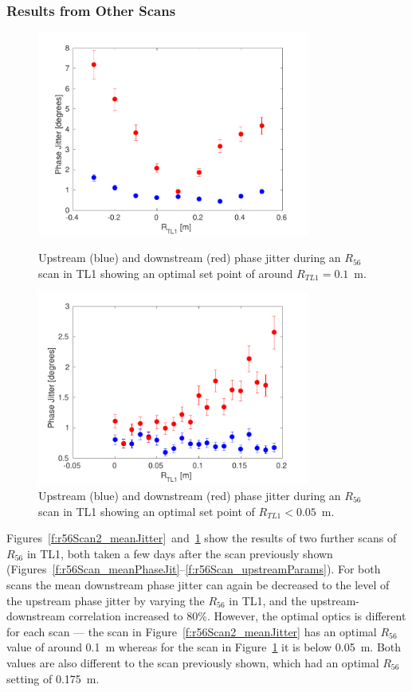 \subsubsection{Results from Other Scans}

\begin{figure}
  \centering
  \includegraphics[width=0.8\textwidth]{Figures/propagation/r56Scan2_meanJitter}
  \caption{Upstream (blue) and downstream (red) phase jitter during an \(R_{56}\) scan in TL1 showing an optimal set point of around \(R_{TL1}=0.1\)~m.}
  \label{f:r56Scan2_meanJitter}
  \includegraphics[width=0.8\textwidth]{Figures/propagation/r56Scan3_meanJitter}
  \caption{Upstream (blue) and downstream (red) phase jitter during an \(R_{56}\) scan in TL1 showing an optimal set point of \(R_{TL1}<0.05\)~m.}
  \label{f:r56Scan3_meanJitter}
\end{figure}


Figures~\ref{f:r56Scan2_meanJitter}~and~\ref{f:r56Scan3_meanJitter} show the results of two further scans of \(R_{56}\) in TL1, both taken a few days after the scan previously shown (Figures~\ref{f:r56Scan_meanPhaseJit}--\ref{f:r56Scan_upstreamParams}). For both scans the mean downstream phase jitter can again be decreased to the level of the upstream phase jitter by varying the \(R_{56}\) in TL1, and the upstream-downstream correlation increased to 80\%. However, the optimal optics is different for each scan --- the scan in Figure~\ref{f:r56Scan2_meanJitter} has an optimal \(R_{56}\) value of around 0.1~m whereas for the scan in Figure~\ref{f:r56Scan3_meanJitter} it is below 0.05~m. Both values are also different to the scan previously shown, which had an optimal \(R_{56}\) setting of 0.175~m.

